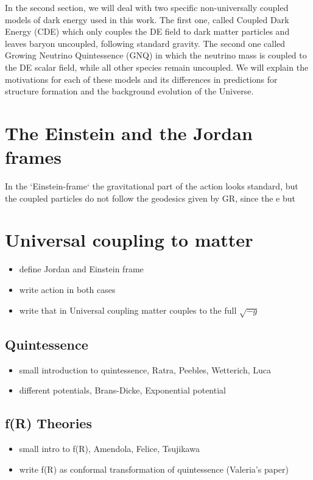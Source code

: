 In the second section, we will deal with two specific non-universally coupled models of dark energy used in this work. 
The first one,
called Coupled Dark Energy (CDE) which only couples the DE field to dark matter particles and leaves baryon uncoupled, following standard
gravity.
The second one called Growing Neutrino Quintessence (GNQ) in which the neutrino mass is coupled to the DE scalar field, while 
all other species remain uncoupled.
We will explain the motivations for each of these models and its differences in predictions for structure formation and the background evolution of the 
Universe.
 
\section{The Einstein and the Jordan frames}

In the `Einstein-frame` the gravitational part of the action looks standard, but the coupled
particles do not follow the geodesics given by GR, since the e
but 

\section{Universal coupling to matter}

\begin{itemize}
\item define Jordan and Einstein frame 
\item write action in both cases
\item write that in Universal coupling matter couples to the full $\sqrt{-g}$
\end{itemize}

\subsection{Quintessence}

\begin{itemize}
\item small introduction to quintessence, Ratra, Peebles, Wetterich, Luca
\item different potentials, Brans-Dicke, Exponential potential
\end{itemize}

\subsection{f(R) Theories}
\begin{itemize}
\item small intro to f(R), Amendola, Felice, Tsujikawa
\item write f(R) as conformal transformation of quintessence (Valeria's paper)
\end{itemize}


